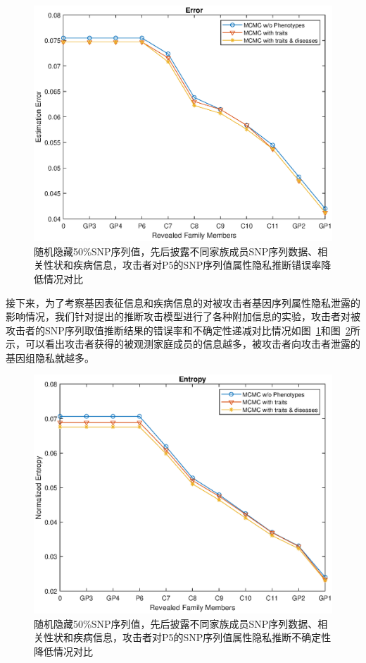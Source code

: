 \begin{figure}[htbp]
	\centering
	\includegraphics[width=0.8\linewidth]{./figures/P5error2.eps}
	\centering
	\caption{随机隐藏50\%SNP序列值，先后披露不同家族成员SNP序列数据、相关性状和疾病信息，攻击者对P5的SNP序列值属性隐私推断错误率降低情况对比}\label{fig:P5error2}
\end{figure}


接下来，为了考察基因表征信息和疾病信息的对被攻击者基因序列属性隐私泄露的影响情况，我们针对提出的推断攻击模型进行了各种附加信息的实验，攻击者对被攻击者的SNP序列取值推断结果的错误率和不确定性递减对比情况如图~\ref{fig:P5error2}和图~\ref{fig:P5entropy2}所示，可以看出攻击者获得的被观测家庭成员的信息越多，被攻击者向攻击者泄露的基因组隐私就越多。

\begin{figure}[htbp]
	\centering
	\includegraphics[width=0.8\linewidth]{./figures/P5entropy2.eps}
	\centering
	\caption{随机隐藏50\%SNP序列值，先后披露不同家族成员SNP序列数据、相关性状和疾病信息，攻击者对P5的SNP序列值属性隐私推断不确定性降低情况对比}\label{fig:P5entropy2}
\end{figure}


